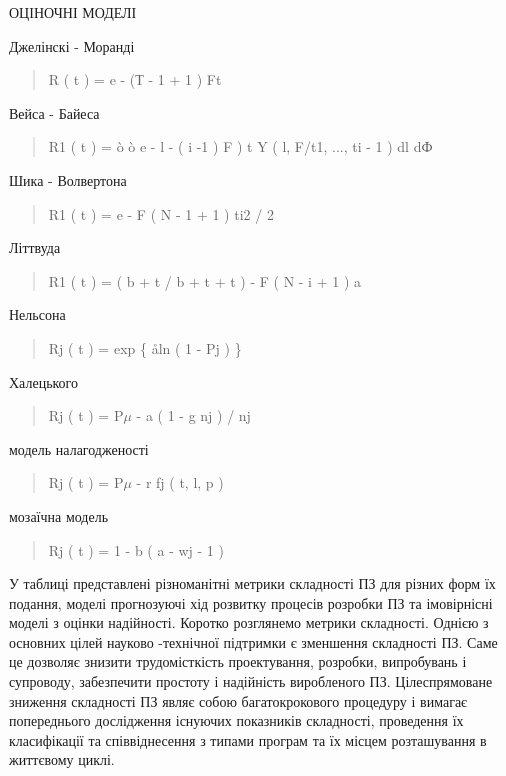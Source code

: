 ОЦІНОЧНІ МОДЕЛІ

Джелінскі - Моранді
\begin{quote}

R ( t ) = e - (Т - 1 + 1 ) Ft
\end{quote}

Вейса - Байеса
\begin{quote}

R1 ( t ) = ò ò e - l - ( i -1 ) F ) t Y ( l, F/t1, ..., ti - 1 ) dl dФ
\end{quote}

Шика - Волвертона
\begin{quote}

R1 ( t ) = e - F ( N - 1 + 1 ) ti2 / 2
\end{quote}

Літтвуда
\begin{quote}

R1 ( t ) = ( b + t / b + t + t ) - F ( N - i + 1 ) a
\end{quote}

Нельсона
\begin{quote}

Rj ( t ) = exp \{ åln ( 1 - Pj ) \}
\end{quote}

Халецького
\begin{quote}

Rj ( t ) = P\(\mu\) - a ( 1 - g nj ) / nj
\end{quote}

модель налагодженості
\begin{quote}

Rj ( t ) = P\(\mu\) - r fj ( t, l, p )
\end{quote}

мозаїчна модель
\begin{quote}

Rj ( t ) = 1 - b ( a - wj - 1 )
\end{quote}

У таблиці представлені різноманітні метрики складності ПЗ для різних форм їх подання, моделі прогнозуючі хід розвитку процесів розробки ПЗ та імовірнісні моделі з оцінки надійності.
Коротко розглянемо метрики складності. Однією з основних цілей науково -технічної підтримки є зменшення складності ПЗ. Саме це дозволяє знизити трудомісткість проектування, розробки, випробувань і супроводу, забезпечити простоту і надійність виробленого ПЗ. Цілеспрямоване зниження складності ПЗ являє собою багатокрокового процедуру і вимагає попереднього дослідження існуючих показників складності, проведення їх класифікації та співвіднесення з типами програм та їх місцем розташування в життєвому циклі.


